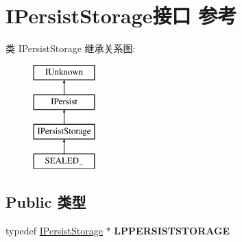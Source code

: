 \hypertarget{interface_i_persist_storage}{}\section{I\+Persist\+Storage接口 参考}
\label{interface_i_persist_storage}
类 I\+Persist\+Storage 继承关系图\+:\begin{figure}[H]
\begin{center}
\leavevmode
\includegraphics[height=4.000000cm]{interface_i_persist_storage}
\end{center}
\end{figure}
\subsection*{Public 类型}
\begin{DoxyCompactItemize}
\item 
\mbox{\label{interface_i_persist_storage_a28cc1fbcc49d83898510cd5e97013ef0}} 
typedef \hyperlink{interface_i_persist_storage}{I\+Persist\+Storage} $\ast$ {\bfseries L\+P\+P\+E\+R\+S\+I\+S\+T\+S\+T\+O\+R\+A\+GE}
\end{DoxyCompactItemize}
